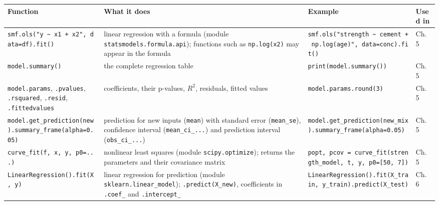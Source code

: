 \documentclass[
  letterpaper,
  DIV=11,
  numbers=noendperiod]{scrreprt}
\begin{document}
\begin{longtable}[]{@{}
  >{\raggedright\arraybackslash}p{}
  >{\raggedright\arraybackslash}p{}
  >{\raggedright\arraybackslash}p{}
  >{\raggedright\arraybackslash}p{}@{}}
\toprule\noalign{}
\begin{minipage}[b]{\linewidth}\raggedright
Function
\end{minipage} & \begin{minipage}[b]{\linewidth}\raggedright
What it does
\end{minipage} & \begin{minipage}[b]{\linewidth}\raggedright
Example
\end{minipage} & \begin{minipage}[b]{\linewidth}\raggedright
Used in
\end{minipage} \\
\midrule\noalign{}
\endhead
\bottomrule\noalign{}
\endlastfoot
\texttt{smf.ols("y\ \textasciitilde{}\ x1\ +\ x2",\ data=df).fit()} &
linear regression with a formula (module
\texttt{statsmodels.formula.api}); functions such as \texttt{np.log(x2)}
may appear in the formula &
\texttt{smf.ols("strength\ \textasciitilde{}\ cement\ +\ np.log(age)",\ data=conc).fit()}
& Ch. 5 \\
\texttt{model.summary()} & the complete regression table &
\texttt{print(model.summary())} & Ch. 5 \\
\texttt{model.params}, \texttt{.pvalues}, \texttt{.rsquared},
\texttt{.resid}, \texttt{.fittedvalues} & coefficients, their p-values,
\(R^2\), residuals, fitted values & \texttt{model.params.round(3)} & Ch.
5 \\
\texttt{model.get\_prediction(new).summary\_frame(alpha=0.05)} &
prediction for new inputs (\texttt{mean}) with standard error
(\texttt{mean\_se}), confidence interval (\texttt{mean\_ci\_...}) and
prediction interval (\texttt{obs\_ci\_...}) &
\texttt{model.get\_prediction(new\_mix).summary\_frame(alpha=0.05)} &
Ch. 5 \\
\texttt{curve\_fit(f,\ x,\ y,\ p0=...)} & nonlinear least squares
(module \texttt{scipy.optimize}); returns the parameters and their
covariance matrix &
\texttt{popt,\ pcov\ =\ curve\_fit(strength\_model,\ t,\ y,\ p0={[}50,\ 7{]})}
& Ch. 5 \\
\texttt{LinearRegression().fit(X,\ y)} & linear regression for
prediction (module \texttt{sklearn.linear\_model});
\texttt{.predict(X\_new)}, coefficients in \texttt{.coef\_} and
\texttt{.intercept\_} &
\texttt{LinearRegression().fit(X\_train,\ y\_train).predict(X\_test)} &
Ch. 6 \\
\end{longtable}
\end{document}
